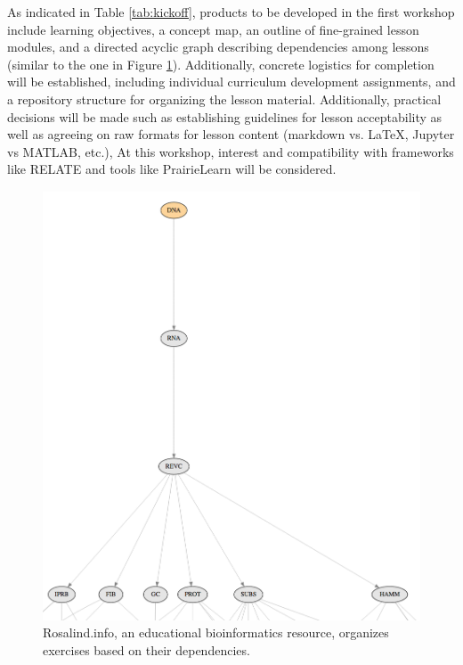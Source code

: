 \documentclass[11pt]{article}
\begin{document}
          As indicated in Table \ref{tab:kickoff}, products to be developed in 
          the first workshop include learning 
          objectives\cite{bloom_bloom_1984}, a concept 
          map\cite{novak_concept_1990}, 
          an outline of fine-grained lesson modules, and a 
          directed acyclic graph describing dependencies among lessons (similar 
          to the one in Figure \ref{fig:rosalind}). Additionally, concrete logistics 
          for completion will be established, including individual curriculum 
          development assignments, and a repository structure for organizing 
          the lesson material. Additionally, practical decisions will be made 
          such as establishing guidelines for lesson acceptability as well as 
          agreeing on raw formats for lesson content (markdown vs. \LaTeX, 
          Jupyter vs MATLAB, etc.),  At this workshop, interest and 
          compatibility with frameworks like RELATE 
          \cite{kloeckner_relate_2017,kloeckner_relate_2017-1} and tools like 
          PrairieLearn \cite{west_prairielearn:_2015} will be considered.

\begin{figure}[ht!]
        \begin{center}
                \includegraphics[height=0.5\textheight]{rosalind.png}
        \end{center}
        \caption{Rosalind.info, an educational bioinformatics resource, 
        organizes exercises based on their dependencies.}
        \label{fig:rosalind}
\end{figure}
          
\end{document}
